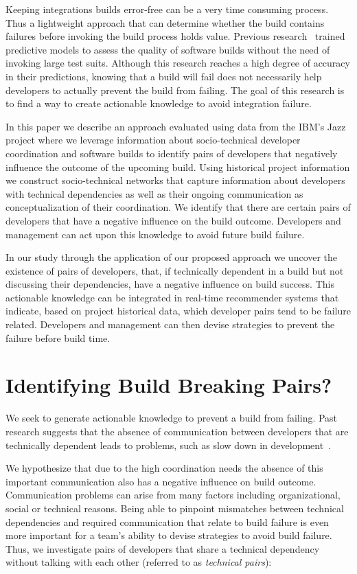 \documentclass[conference]{IEEEtran}
\begin{document}
Keeping integrations builds error-free can be a very time consuming
process. 
Thus a lightweight approach that can determine whether the build contains
failures before invoking the build process holds value. Previous
research~\cite{wolf:icse:2009,hassan:ase:2006} trained predictive models to assess the quality of software builds without the need of invoking large test
suits. Although this research
reaches a high degree of accuracy in their predictions, knowing that a
build will fail does not necessarily help developers to actually prevent
the build from failing.
The goal of this research is to find a way to create actionable knowledge to avoid
integration failure.

In this paper we describe an approach evaluated using data from the IBM's Jazz project where we leverage
information about socio-technical developer coordination and software builds to
identify pairs of developers that negatively influence the outcome of the
upcoming build. Using historical project information we construct socio-technical
networks that capture information about developers with technical dependencies
as well as their ongoing communication as conceptualization of their coordination.
We identify that there are certain pairs of developers that have a
negative influence on the build outcome. Developers and management can
act upon this knowledge to avoid future build failure.

In our study through the application of our proposed approach we uncover the existence of pairs of
developers, that, if technically dependent in a build but not discussing their
dependencies, have a negative influence on build success. This
actionable knowledge can be integrated in real-time recommender systems that
indicate, based on project historical data, which developer pairs tend to be
failure related. Developers and management can then devise strategies to
prevent the failure before build time. 



\section{Identifying Build Breaking Pairs?}
\label{sec:pattern}
We seek to generate actionable knowledge to
prevent a build from failing. Past research suggests that the absence of
communication between developers that are technically dependent leads to
problems, such as slow down in development~\cite{cataldo:esem:2008}.


We hypothesize that due to the high coordination needs the absence of this
important communication also has a negative influence on build outcome. Communication problems can arise from many factors including organizational,
social or technical reasons. Being able to pinpoint
mismatches between technical dependencies and required communication that
relate to build failure is even more important for a team's
ability to devise strategies to avoid build failure. Thus, we
investigate pairs of developers that share a technical dependency without talking
with each other (referred to as \emph{technical pairs}):
\ \\ \
\end{document}
